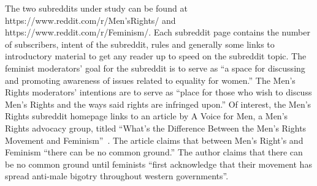 \documentclass[letterpaper]{article}
\newcommand{\yy}[1]{{\textcolor{green}{yy: #1}}}
\newcommand{\pat}[1]{{\textcolor{red}{Pat: #1}}}
\begin{document}
The two subreddits under study can be found at https://www.reddit.com/r/Men'sRights/ and https://www.reddit.com/r/Feminism/. Each subreddit page contains the number of subscribers, intent of the subreddit, rules and generally some links to introductory material to get any reader up to speed on the subreddit topic. The feminist moderators' goal for the subreddit is to serve as ``a space for discussing and promoting awareness of issues related to equality for women.'' The Men's Rights moderators' intentions are to serve as ``place for those who wish to discuss Men's Rights and the ways said rights are infringed upon.'' Of interest, the Men's Rights subreddit homepage links to an article by A Voice for Men, a Men's Rights advocacy group, titled ``What's the Difference Between the Men's Rights Movement and Feminism''~\cite{white2011differencebetweenMRandFem}. The article claims that between Men's Right's and Feminism ``there can be no common ground.'' The author claims that there can be no common ground until feminists ``first acknowledge that their movement has spread anti-male bigotry throughout western governments''. %


\end{document}
